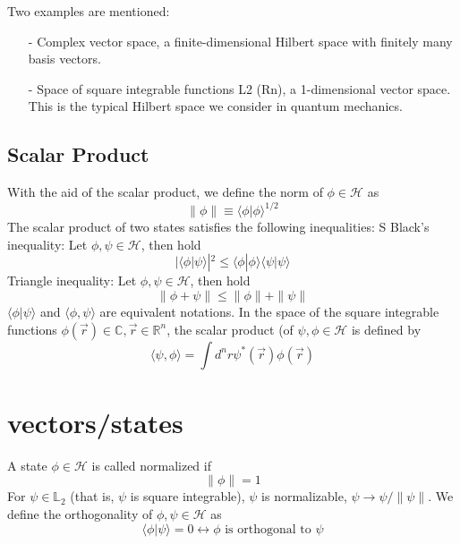 Two examples are mentioned:
\begin{itemize}
    \item[-] Complex vector space, a finite-dimensional Hilbert space with finitely many basis vectors.
    \item[-] Space of square integrable functions L2 (Rn), a 1-dimensional vector space. This is the typical Hilbert space we consider in quantum mechanics.
\end{itemize}

\subsection{Scalar Product}
With the aid of the scalar product, we define the norm of $\phi\in\mathcal{H}$ as
\begin{equation}
    \|\phi\| \equiv\langle\phi | \phi\rangle^{1 / 2}
\end{equation}
The scalar product of two states satisfies the following inequalities: S Black's inequality: Let $\phi,\psi\in\mathcal{H}$, then hold
\begin{equation}
    |\langle\phi | \psi\rangle|^{2} \leq\langle\phi | \phi\rangle\langle\psi | \psi\rangle
\end{equation}
Triangle inequality: Let $\phi,\psi\in\mathcal{H}$, then hold
\begin{equation}
    \|\phi+\psi\| \leq\|\phi\|+\|\psi\|
\end{equation}
$\langle\phi|\psi\rangle$ and $\langle\phi,\psi\rangle$ are equivalent notations. In the space of the square integrable functions $\phi(\vec{r})\in\mathbb{C},\vec{r}\in\mathbb{R}^n$, the scalar product (of $\psi,\phi\in\mathcal{H}$ is defined by
\begin{equation}
    \langle\psi, \phi\rangle=\int d^{n} r \psi^{*}(\vec{r}) \phi(\vec{r})
\end{equation}

\section{vectors/states}
A state $\phi\in\mathcal{H}$ is called normalized if
\begin{equation}
    \|\phi\|=1
\end{equation}
For $\psi\in\mathbb{L}_2$ (that is, $\psi$ is square integrable), $\psi$ is normalizable, $\psi\to\psi/\parallel\psi\parallel$. We define the orthogonality of $\phi,\psi\in\mathcal{H}$ as
\begin{equation}
    \langle\phi | \psi\rangle= 0 \leftrightarrow \phi \text { is orthogonal to } \psi
    \end{equation}
